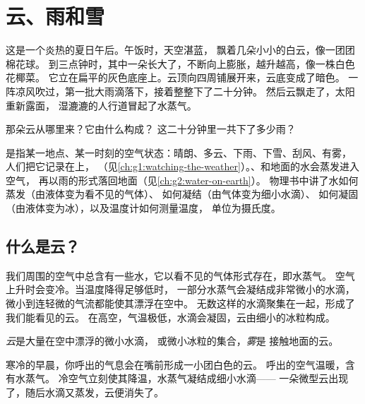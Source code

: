\chapter{云、雨和雪}\label{ch:g4:clouds-rain-snow}

这是一个炎热的夏日午后。午饭时，天空湛蓝，
飘着几朵小小的白云，像一团团棉花球。
到三点钟时，其中一朵长大了，不断向上膨胀，越升越高，像一株白色花椰菜。
它立在扁平的灰色底座上。云顶向四周铺展开来，云底变成了暗色。
一阵凉风吹过，第一批大雨滴落下，接着整整下了二十分钟。
然后云飘走了，太阳重新露面，
湿漉漉的人行道冒起了水蒸气。

那朵云从哪里来？它由什么构成？
这二十分钟里一共下了多少雨？

\begin{recall}
是指某一地点、某一时刻的空气状态：晴朗、多云、下雨、下雪、刮风、有雾，
人们把它记录在上，
（见\cref{ch:g1:watching-the-weather}）。、和地面的水会蒸发进入空气，
再以雨的形式落回地面（见\cref{ch:g2:water-on-earth}）。
物理书中讲了水如何蒸发（由液体变为看不见的气体）、
如何凝结（由气体变为细小水滴）、
如何凝固（由液体变为冰），以及温度计如何测量温度，
单位为摄氏度。
\end{recall}

\section{什么是云？}

我们周围的空气中总含有一些水，它以看不见的气体形式存在，即水蒸气。
空气上升时会变冷。当温度降得足够低时，
一部分水蒸气会凝结成非常微小的水滴，
微小到连轻微的气流都能使其漂浮在空中。
无数这样的水滴聚集在一起，形成了我们能看见的云。
在高空，气温极低，水滴会凝固，云由细小的冰粒构成。

\begin{definition}[云与雾]\label{def:g4:clouds-rain-snow:cloud}
\emph{云}是大量在空中漂浮的微小水滴，
或微小冰粒的集合，\emph{雾}是
接触地面的云。
\end{definition}

\begin{example}[清晨的呼吸]\label{ex:g4:clouds-rain-snow:breath}
寒冷的早晨，你呼出的气息会在嘴前形成一小团白色的云。
呼出的空气温暖，含有水蒸气。
冷空气立刻使其降温，水蒸气凝结成细小水滴——
一朵微型云出现了，随后水滴又蒸发，云便消失了。
\end{example}

